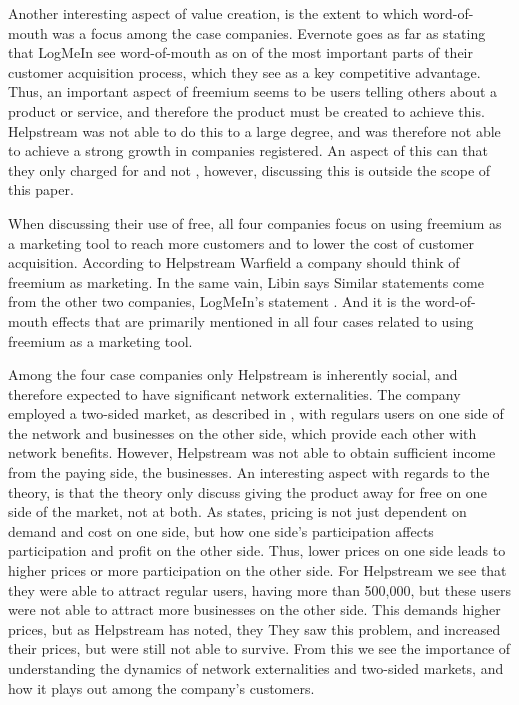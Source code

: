 
Another interesting aspect of value creation, is the extent to which word-of-mouth was a focus among the case companies. Evernote goes as far as stating that  LogMeIn see word-of-mouth as on of the most important parts of their customer acquisition process, which they see as a key competitive advantage. Thus, an important aspect of freemium seems to be users telling others about a product or service, and therefore the product must be created to achieve this. Helpstream was not able to do this to a large degree, and was therefore not able to achieve a strong growth in companies registered. An aspect of this can that they only charged for  and not , however, discussing this is outside the scope of this paper.

When discussing their use of free, all four companies focus on using freemium as a marketing tool to reach more customers and to lower the cost of customer acquisition. According to Helpstream  Warfield a company should think of freemium as marketing. In the same vain, Libin says  Similar statements come from the other two companies, \eg LogMeIn's statement . And it is the word-of-mouth effects that are primarily mentioned in all four cases related to using freemium as a marketing tool. 


Among the four case companies only Helpstream is inherently social, and therefore expected to have significant network externalities. The company employed a two-sided market, as described in , with regulars users on one side of the network and businesses on the other side, which provide each other with network benefits. However, Helpstream was not able to obtain sufficient income from the paying side, the businesses. An interesting aspect with regards to the theory, is that the theory only discuss giving the product away for free on one side of the market, not at both. As \citet{rysman2009} states, pricing is not just dependent on demand and cost on one side, but how one side's participation affects participation and profit on the other side. Thus, lower prices on one side leads to higher prices or more participation on the other side. For Helpstream we see that they were able to attract regular users, having more than 500,000, but these users were not able to attract more businesses on the other side. This demands higher prices, but as Helpstream has noted, they  They saw this problem, and increased their prices, but were still not able to survive. From this we see the importance of understanding the dynamics of network externalities and two-sided markets, and how it plays out among the company's customers.

